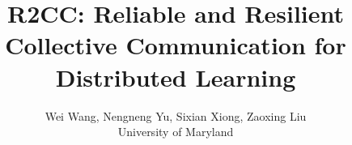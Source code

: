 \documentclass[letterpaper,twocolumn,10pt]{article}
\begin{document}
\pagestyle{empty}

\date{}

\title{\Large \bf R2CC: Reliable and Resilient Collective Communication for Distributed Learning}

\author{
{\rm Wei Wang, Nengneng Yu, Sixian Xiong, Zaoxing Liu}\\
University of Maryland
}

\maketitle

























\end{document}
